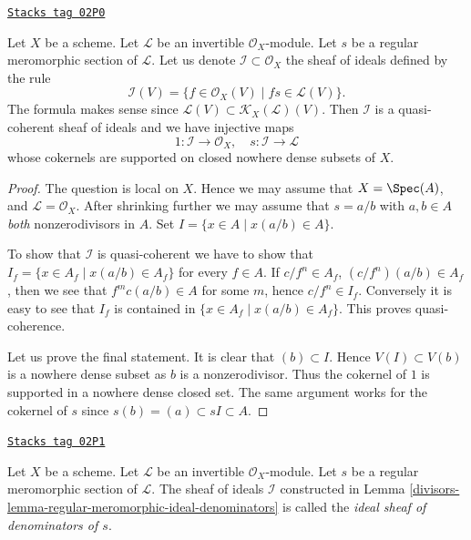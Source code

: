 \begin{lemma}
\label{divisors-lemma-regular-meromorphic-ideal-denominators}
\href{https://stacks.math.columbia.edu/tag/02P0}{\texttt{Stacks tag 02P0}}

Let $X$ be a scheme.
Let $\mathcal{L}$ be an invertible $\mathcal{O}_X$-module.
Let $s$ be a regular meromorphic section of $\mathcal{L}$.
Let us denote $\mathcal{I} \subset \mathcal{O}_X$ the
sheaf of ideals defined by the rule
$$
\mathcal{I}(V)
=
\{f \in \mathcal{O}_X(V) \mid fs \in \mathcal{L}(V)\}.
$$
The formula makes sense since
$\mathcal{L}(V) \subset \mathcal{K}_X(\mathcal{L})(V)$.
Then $\mathcal{I}$ is a quasi-coherent sheaf of ideals and
we have injective maps
$$
1 : \mathcal{I} \longrightarrow \mathcal{O}_X,
\quad
s : \mathcal{I} \longrightarrow \mathcal{L}
$$
whose cokernels are supported on closed nowhere dense subsets of $X$.
\end{lemma}

\begin{proof}
The question is local on $X$.
Hence we may assume that $X = \Spec(A)$,
and $\mathcal{L} = \mathcal{O}_X$. After shrinking further
we may assume that $s = a/b$ with $a, b \in A$ {\it both}
nonzerodivisors in $A$. Set $I = \{x \in A \mid x(a/b) \in A\}$.

\medskip\noindent
To show that $\mathcal{I}$ is quasi-coherent we have to show
that $I_f = \{x \in A_f \mid x(a/b) \in A_f\}$ for every
$f \in A$. If $c/f^n \in A_f$, $(c/f^n)(a/b) \in A_f$, then we see
that $f^mc(a/b) \in A$ for some $m$, hence $c/f^n \in I_f$.
Conversely it is easy to see that $I_f$ is contained in
$\{x \in A_f \mid x(a/b) \in A_f\}$. This proves quasi-coherence.

\medskip\noindent
Let us prove the final statement. It is clear that $(b) \subset I$.
Hence $V(I) \subset V(b)$ is a nowhere dense subset as $b$ is
a nonzerodivisor. Thus the cokernel of $1$ is supported in a nowhere
dense closed set. The same argument works for the cokernel
of $s$ since $s(b) = (a) \subset sI \subset A$.
\end{proof}

\begin{definition}
\label{divisors-definition-regular-meromorphic-ideal-denominators}
\href{https://stacks.math.columbia.edu/tag/02P1}{\texttt{Stacks tag 02P1}}

Let $X$ be a scheme.
Let $\mathcal{L}$ be an invertible $\mathcal{O}_X$-module.
Let $s$ be a regular meromorphic section of $\mathcal{L}$.
The sheaf of ideals $\mathcal{I}$ constructed in
Lemma \ref{divisors-lemma-regular-meromorphic-ideal-denominators}
is called the {\it ideal sheaf of denominators of $s$}.
\end{definition}

